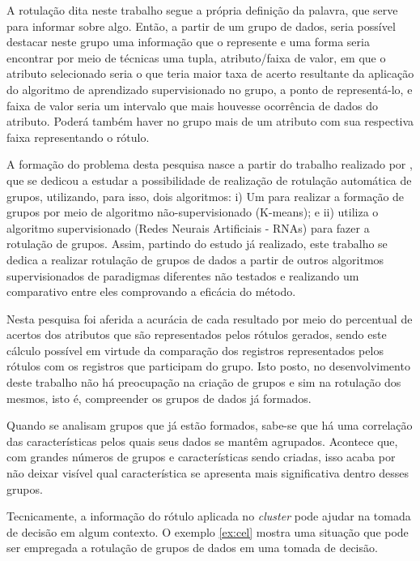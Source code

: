 A rotulação dita neste trabalho segue a própria definição da palavra, que serve para informar sobre algo. Então, a partir de um grupo de dados, seria possível destacar neste grupo uma informação que o represente e uma forma seria encontrar por meio de técnicas uma tupla, atributo/faixa de valor, em que o atributo selecionado seria o que teria maior taxa de acerto resultante da aplicação do algoritmo de aprendizado supervisionado no grupo, a ponto de representá-lo, e faixa de valor seria um intervalo que mais houvesse ocorrência de dados do atributo. Poderá também haver no grupo mais de um atributo com sua respectiva faixa representando o rótulo. 



A formação do problema desta pesquisa nasce a partir do trabalho realizado por , que se dedicou a estudar a possibilidade de realização de rotulação automática de grupos, utilizando, para isso, dois algoritmos: i) Um para realizar a formação de grupos por meio de algoritmo não-supervisionado (K-means); e ii) utiliza o algoritmo supervisionado (Redes Neurais Artificiais - RNAs) para fazer a rotulação de grupos. Assim, partindo do estudo já realizado, este trabalho se dedica a realizar rotulação de grupos de dados a partir de outros algoritmos supervisionados de paradigmas diferentes não testados e realizando um comparativo entre eles comprovando a eficácia do método. 

Nesta pesquisa foi aferida a acurácia de cada resultado por meio do percentual de acertos dos atributos que são representados pelos rótulos gerados, sendo este cálculo possível em virtude da comparação dos registros representados pelos rótulos com os registros que participam do grupo. Isto posto, no desenvolvimento deste trabalho não há preocupação na criação de grupos e sim na rotulação dos mesmos, isto é, compreender os grupos de dados já formados. 


Quando se analisam grupos que já estão formados, sabe-se que há uma correlação das características pelos quais seus dados se mantêm agrupados. Acontece que, com grandes números de grupos e características sendo criadas, isso acaba por não deixar visível qual característica se apresenta mais significativa dentro desses grupos.

Tecnicamente, a informação do rótulo aplicada no \textit{cluster} pode ajudar na tomada de decisão em algum contexto. O exemplo \ref{ex:cel} mostra uma situação que pode ser empregada a rotulação de grupos de dados em uma tomada de decisão.

